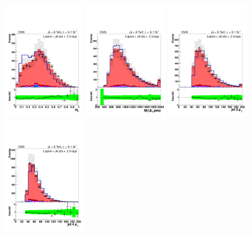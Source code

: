 \begin{figure}[hbtp]
 \begin{center}
   \includegraphics[width=0.31\textwidth]{Figures/Analysis_1_Diagrams/d2MCPlots_h3_cut3_jge6_t2_Combined_HtWgt.pdf}
   \includegraphics[width=0.31\textwidth]{Figures/Analysis_1_Diagrams/d2MCPlots_dijet_mass_of_everything_cut3_jge6_t2_Combined_HtWgt.pdf}
   \includegraphics[width=0.31\textwidth]{Figures/Analysis_1_Diagrams/d2MCPlots_third_jet_pt_cut3_jge6_t2_Combined_HtWgt.pdf}
   \includegraphics[width=0.31\textwidth]{Figures/Analysis_1_Diagrams/d2MCPlots_fourth_jet_pt_cut3_jge6_t2_Combined_HtWgt.pdf}

\end{center}
\end{figure}
